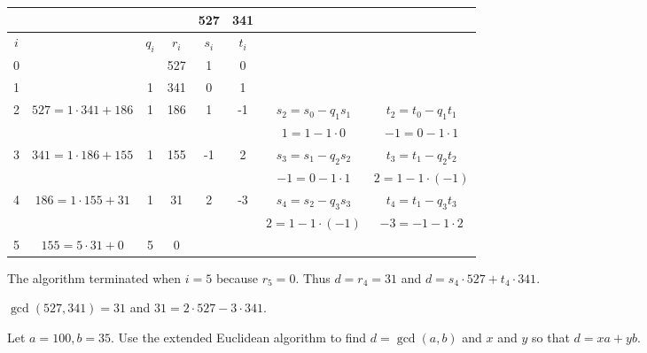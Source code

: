 \documentclass[oneside,12pt]{amsart}
\begin{document}
\begin{tabular}{|c|c|c|c|c|c|c|c|}
\hline
\quad & \quad                     & \quad       & \quad & 527    & 341   &  \quad                   & \quad \\ \hline
$i$   & \quad                     & $q_{i}$     & $r_i$ & $s_i$  & $t_i$ &  \quad                   & \quad \\ \hline\hline
0     & \quad                     & \quad       & 527   &  1     & 0     &  \quad                   & \quad \\ \hline
1     & \quad                     &  1          & 341   &  0     & 1     &  \quad                   & \quad \\ \hline
2     & $527 = 1\cdot 341 + 186$  &  1          & 186   &  1     & -1    & $s_2 = s_0 - q_1 s_1$    & $t_2 = t_0 - q_1 t_1$  \\
\quad & \quad                     & \quad       & \quad & \quad  & \quad & $1 =   1 - 1 \cdot 0$    & $-1=0-1\cdot1$ \\ \hline
3     & $341 = 1 \cdot 186 + 155$ &  1          & 155   &  -1    & 2     & $s_3 = s_1 - q_2 s_2$    & $t_3 = t_1 - q_2 t_2$  \\
\quad & \quad                     & \quad       & \quad & \quad  & \quad & $-1 =   0 - 1 \cdot 1$   & $2=1-1\cdot(-1)$ \\ \hline
4     & $186 = 1 \cdot 155 + 31$  &  1          & 31    &  2     & -3    & $s_4 = s_2 - q_3 s_3$    & $t_4 = t_1 - q_3 t_3$  \\
\quad & \quad                     & \quad       & \quad & \quad  & \quad & $2 =   1 - 1 \cdot (-1)$ & $-3=-1-1\cdot 2$ \\ \hline
5     & $155 = 5 \cdot 31 + 0$    &  5          & 0     & \quad  & \quad & \quad  &  \\ \hline
\end{tabular}

\bigskip

The algorithm terminated when $i=5$ because $r_5=0$. Thus $d=r_4=31$ and 
$d = s_4\cdot 527 + t_4 \cdot 341$.

\bigskip
$\gcd(527, 341) = 31$ and $31 = 2 \cdot 527 - 3 \cdot 341$.


\bigskip

\begin{example} Let $a=100, b=35$. Use the extended Euclidean algorithm to find $d=\gcd(a,b)$ and $x$ and $y$ so
that $d=xa+yb$.
\end{example}

\bigskip
\end{document}
